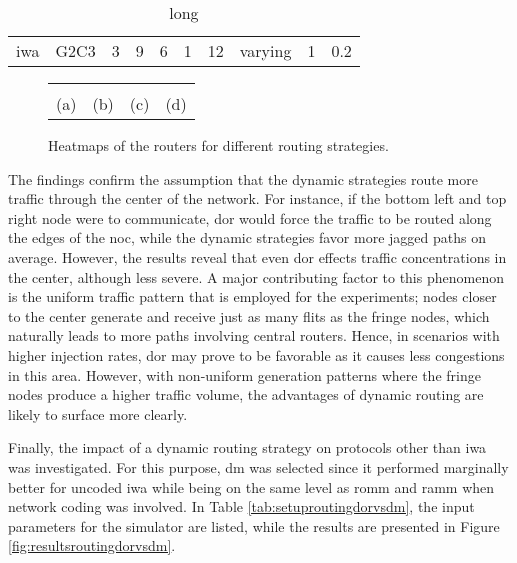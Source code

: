 \begin{table}
    \centering
    \begin{tabulary}{\textwidth}{C|C|C|C|C|C|C|C|C|C}
        \pProtVar{} & \pNCMode{} & \pEncMods{} & \pAuthMods{} & \pRQSize{} & \pARQLimit{} & \pARQTimeout{} & \pRStrat{} & \pAttackerSet{} & \pAttackProb{} \\\hline
        \gls{iwa} & G2C3 & 3 & 9 & 6 & 1 & 12 & varying & 1 & 0.2 \\
    \end{tabulary}
    \caption[Input parameters for routing heatmap comparison]{long}
    \label{tab:setuproutingheatmaps}
\end{table}

\begin{figure}
    \begin{tabular}{cccc}
         &  &
         &  \\
        (a) & (b) & (c) & (d) \\
    \end{tabular}
    \caption[Heatmaps of the routers for different routing strategies]{Heatmaps of the routers for different routing strategies.}
    \label{fig:resultsroutingstratheatmaps}
\end{figure}

The findings confirm the assumption that the dynamic strategies route more traffic through the center of the network. For instance, if the bottom
left and top right node were to communicate, \gls{dor} would force the traffic to be routed along the edges of the \gls{noc}, while the dynamic
strategies favor more jagged paths on average. However, the results reveal that even \gls{dor} effects traffic concentrations in the center, although
less severe. A major contributing factor to this phenomenon is the uniform traffic pattern that is employed for the experiments; nodes closer to the
center generate and receive just as many flits as the fringe nodes, which naturally leads to more paths involving central routers. Hence, in scenarios
with higher injection rates, \gls{dor} may prove to be favorable as it causes less congestions in this area. However, with non-uniform generation
patterns where the fringe nodes produce a higher traffic volume, the advantages of dynamic routing are likely to surface more clearly.

Finally, the impact of a dynamic routing strategy on protocols other than \gls{iwa} was investigated. For this purpose, \gls{dm} was selected since it
performed marginally better for uncoded \gls{iwa} while being on the same level as \gls{romm} and \gls{ramm} when network coding was involved. In
Table \vref{tab:setuproutingdorvsdm}, the input parameters for the simulator are listed, while the results are presented in Figure
\vref{fig:resultsroutingdorvsdm}.

